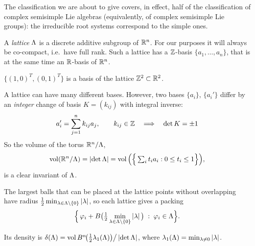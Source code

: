 \begin{remark}
The classification we are about to give covers, in effect, half of the classification of complex
semisimple Lie algebras (equivalently, of complex semisimple Lie groups): the irreducible root systems
correspond to the simple ones.
\end{remark}

\begin{definition}\label{L04a:def:lattice}
A \emph{lattice} $\Lambda$ is a discrete additive subgroup of $\mathbb{R}^n$. For our purposes it will always be
co-compact, i.e.\ have full rank. Such a lattice has a $\mathbb{Z}$-basis $\{a_1,\dots,a_n\}$,
 that is at the same time an $\mathbb{R}$-basis of $\mathbb{R}^n$.
\end{definition}

\begin{example}
$\{(1,0)^T,(0,1)^T\}$ is a basis of the lattice $\mathbb{Z}^2\subset\mathbb{R}^2$.
\end{example}

A lattice can have many different bases. However, two bases $\{a_i\}$, $\{a_i'\}$ differ by an
\emph{integer} change of basis $K=(k_{ij})$ with integral inverse:
\[
  a_i' = \sum_{j=1}^n k_{ij} a_j, \qquad k_{ij}\in\mathbb{Z}
  \quad\Longrightarrow\quad \det K = \pm 1
\]
So the volume of the torus $\mathbb{R}^n/\Lambda$,
\[
  \operatorname{vol}(\mathbb{R}^n/\Lambda) = \left\lvert \det\Lambda \right\rvert = \operatorname{vol}\Big(\Big\{\textstyle\sum_i t_i a_i : 0\le t_i\le 1\Big\}\Big),
\]
 is a clear invariant of $\Lambda$.

The largest balls that can be placed at the lattice points without overlapping have radius
$\tfrac12\min_{\lambda\in\Lambda\setminus\{0\}}\left\lvert \lambda \right\rvert$, so each lattice gives a packing
\[
  \Big\{\, \varphi_i + B\big(\tfrac12 \min_{\lambda\in\Lambda\setminus\{0\}} \left\lvert \lambda \right\rvert\big) \;:\; \varphi_i\in\Lambda \Big\}.
\]
\begin{addedblock}
Its density is
$\delta(\Lambda) = \operatorname{vol} B^n\!\big(\tfrac12\lambda_1(\Lambda)\big)\big/\left\lvert \det\Lambda \right\rvert$, where
$\lambda_1(\Lambda)=\min_{\lambda\neq0}\left\lvert \lambda \right\rvert$.
\end{addedblock}

